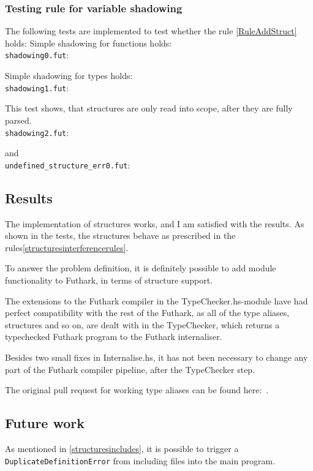 \subsubsection{Testing rule for variable shadowing}
The following tests are implemented to test whether the rule \ref{RuleAddStruct} holds:
Simple shadowing for functions holds:
\\
\texttt{shadowing0.fut}:

Simple shadowing for types holds:
\\
\texttt{shadowing1.fut}:

This test shows, that structures are only read into scope, after they are fully parsed.
\\
\texttt{shadowing2.fut}:

and
\\
\texttt{undefined\_structure\_err0.fut}:

\clearpage
\subsection{Results}
\label{subsec:structuresresults}
The implementation of structures works, and I am satisfied with the results. As
shown in the tests, the structures behave as prescribed in the rules\ref{structuresinterferencerules}.

To answer the problem definition, it is definitely possible to add module
functionality to Futhark, in terms of structure support.

The extensions to the Futhark compiler in the TypeChecker.hs-module have had perfect compatibility with the rest
of the Futhark, as all of the type aliases, structures and so on, are dealt with
in the TypeChecker, which returns a typechecked Futhark program to the Futhark
internaliser.

Besides two small fixes in Internalise.hs, it has not been necessary to change
any part of the Futhark compiler pipeline, after the TypeChecker step.

The original pull request for working type aliases can be found here:~\cite{structure_commit}.
\subsection{Future work}
\label{subsec:StructuresFutureWork}
As mentioned in \ref{structuresincludes}, it is possible to trigger a
\texttt{DuplicateDefinitionError} from including files into the main program.

